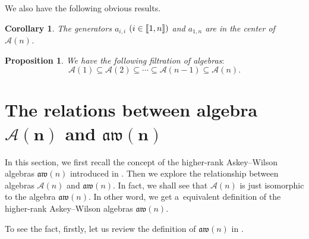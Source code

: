 \documentclass[10pt,a4paper]{amsart}
\numberwithin{equation}{section}
\def\A{\mathscr{A}}
\def\aw{\mathfrak{aw}}
\def\lbb#1{\left[\kern-0.15em\left[ {#1} \right] \kern-0.15em\right]}
\newtheorem{Corollary}[Theorem]{Corollary}
\newtheorem{Proposition}[Theorem]{Proposition}
 { \theoremstyle{definition}
\newtheorem{Definition}[Theorem]{Definition}
\newtheorem{Note}[Theorem]{Note}
\newtheorem{Example}[Theorem]{Example}
\newtheorem{Remark}[Theorem]{Remark} }
\begin{document}
We also have the following obvious results.
\begin{Corollary}
The generators $a_{i, i}$ $(i \in \lbb{1,n})$ and $ a_{1, n}$ are in the center of $\A(n)$.
\end{Corollary}

\begin{Proposition} We have the following filtration of algebras$:$
\begin{equation*}
\A(1) \subseteq \A(2) \subseteq \cdots \subseteq \A(n-1) \subseteq \A(n).
\end{equation*}
\end{Proposition}

\section[The relations between algebra A(n) and aw(n)]{The relations between algebra $\boldsymbol{\A(n)}$ and $\boldsymbol{\aw(n)}$}\label{sect:relations}
In this section, we first recall the concept of the higher-rank Askey--Wilson algebras $\aw(n)$ introduced in \cite{CFPR(2023)}.
Then we explore the relationship between algebras $\A(n)$ and $\aw(n)$.
In fact, we shall see that $\A(n)$ is just isomorphic to the algebra $\aw(n)$.
In other word, we get a~equivalent definition of the higher-rank Askey--Wilson algebras $\aw(n)$.

To see the fact, firstly, let us review the definition of $\aw(n)$ in \cite{CFPR(2023)}.
\end{document}
